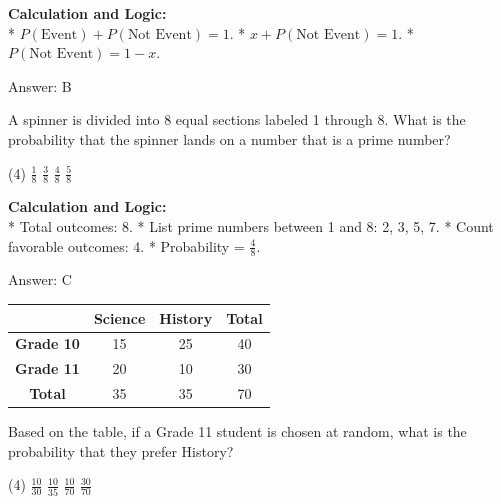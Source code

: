 \documentclass[11pt,paper=a4,answers]{exam}
\begin{document}
\begin{questions}
\begin{solution}
\textbf{Calculation and Logic:} \\
* $P(\text{Event}) + P(\text{Not Event}) = 1$.
* $x + P(\text{Not Event}) = 1$.
* $P(\text{Not Event}) = 1 - x$.

\vspace{30pt}

Answer: \colorbox{yellow!100}{B}
\end{solution}

\vspace{60pt}

\question
A spinner is divided into 8 equal sections labeled 1 through 8. What is the probability that the spinner lands on a number that is a prime number?
\begin{tasks}(4)
    \task $\frac{1}{8}$
    \task $\frac{3}{8}$
    \task $\frac{4}{8}$
    \task $\frac{5}{8}$
\end{tasks}

\begin{solution}
\textbf{Calculation and Logic:} \\
* Total outcomes: 8.
* List prime numbers between 1 and 8: 2, 3, 5, 7.
* Count favorable outcomes: 4.
* Probability = $\frac{4}{8}$.

\vspace{30pt}

Answer: \colorbox{yellow!100}{C}
\end{solution}

\vspace{60pt}

\question
\begin{center}
\begin{tabular}{|c|c|c|c|}
\hline
 & \textbf{Science} & \textbf{History} & \textbf{Total} \\ \hline
\textbf{Grade 10} & 15 & 25 & 40 \\ \hline
\textbf{Grade 11} & 20 & 10 & 30 \\ \hline
\textbf{Total} & 35 & 35 & 70 \\ \hline
\end{tabular}
\end{center}
Based on the table, if a Grade 11 student is chosen at random, what is the probability that they prefer History?
\begin{tasks}(4)
    \task $\frac{10}{30}$
    \task $\frac{10}{35}$
    \task $\frac{10}{70}$
    \task $\frac{30}{70}$
\end{tasks}


\end{questions}
\end{document}
